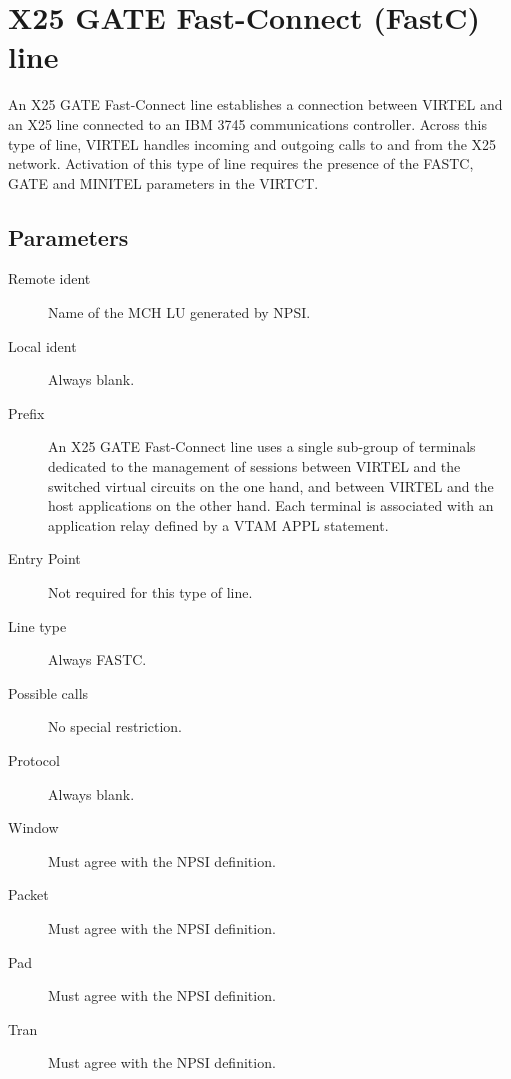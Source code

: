 \documentclass[letterpaper,10pt,english]{sphinxmanual}
\begin{document}
\newpage


\section{X25 GATE Fast-Connect (FastC) line}
\label{\detokenize{connectivity_guide:x25-gate-fast-connect-fastc-line}}\label{\detokenize{connectivity_guide:index-68}}
An X25 GATE Fast-Connect line establishes a connection between VIRTEL and an X25 line connected to an IBM 3745 communications controller. Across this type of line, VIRTEL handles incoming and outgoing calls to and from the X25 network. Activation of this type of line requires the presence of the FASTC, GATE and MINITEL parameters in the VIRTCT.



\subsection{Parameters}
\label{\detokenize{connectivity_guide:index-69}}\label{\detokenize{connectivity_guide:id31}}\begin{description}
\item[{Remote ident}] \leavevmode
Name of the MCH LU generated by NPSI.

\item[{Local ident}] \leavevmode
Always blank.

\item[{Prefix}] \leavevmode
An X25 GATE Fast-Connect line uses a single sub-group of terminals dedicated to the management of sessions between VIRTEL and the switched virtual circuits on the one hand, and between VIRTEL and the host applications on the other hand. Each terminal is associated with an application relay defined by a VTAM APPL statement.

\item[{Entry Point}] \leavevmode
Not required for this type of line.

\item[{Line type}] \leavevmode
Always FASTC.

\item[{Possible calls}] \leavevmode
No special restriction.

\item[{Protocol}] \leavevmode
Always blank.

\item[{Window}] \leavevmode
Must agree with the NPSI definition.

\item[{Packet}] \leavevmode
Must agree with the NPSI definition.

\item[{Pad}] \leavevmode
Must agree with the NPSI definition.

\item[{Tran}] \leavevmode
Must agree with the NPSI definition.

\end{description}
\end{document}

